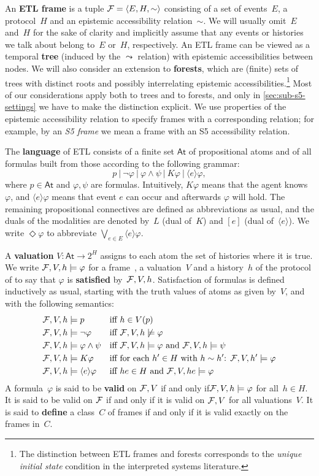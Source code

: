 \documentclass{article}
\def\dfn{\textbf}
\newcommand{\acc}{\sim}
\newcommand{\nextstep}{\Diamond}
\newcommand{\after}[1]{\langle#1\rangle}
\newcommand{\afterall}[1]{[#1]}
\renewcommand{\phi}{\varphi}
\newcommand{\tiff}{if and only if\xspace}
\newcounter{#1}
\begin{document}
An \dfn{ETL frame} is a tuple $\F=\langle E,H,\acc\rangle$ consisting of
a set of events~$E$, a protocol~$H$ and an epistemic accessibility relation~$\acc$.
We will usually omit~$E$ and~$H$ for the sake of clarity and implicitly assume that
any events or histories we talk about belong to~$E$ or~$H$, respectively.
An ETL frame can be viewed as a temporal \dfn{tree} (induced by the $\leadsto$ relation)
with epistemic accessibilities between nodes.
We will also consider an extension to \dfn{forests},
which are (finite) sets of trees with distinct roots and possibly interrelating epistemic accessibilities.\footnote{The distinction between ETL frames and forests corresponds
  to the \emph{unique initial state} condition in the interpreted systems literature.}
Most of our considerations apply both to trees and to forests,
and only in \cref{sec:sub-s5-settings} we have to make the distinction explicit.
We use properties of the epistemic accessibility relation to specify frames with a corresponding relation;
for example, by an \emph{S5 frame} we mean a frame with an S5 accessibility relation.

The \dfn{language} of ETL consists of a finite set $\mathsf{At}$ of propositional atoms
and of all formulas built from those according to the following grammar:
\[
p~|~\neg\varphi~|~\varphi\wedge\psi~|~K\varphi~|~\after e \varphi\mathpunct,
\]
where $p\in\mathsf{At}$ and $\varphi,\psi$ are formulas.
Intuitively, $K\varphi$ means that the agent knows $\varphi$,
and $\after e\varphi$ means that event $e$ can occur and afterwards $\varphi$ will hold.
The remaining propositional connectives are defined as abbreviations as usual,
and the duals of the modalities are denoted by~$L$ (dual of~$K$) and $\afterall e$ (dual of~$\after e$).
We write $\nextstep\phi$ to abbreviate $\bigvee_{e\in E}\after e\phi$.

A \dfn{valuation} $V:\mathsf{At}\to 2^H$ assigns to each atom the set of histories where it is true.
We write $\mathcal{F},V,h\models\varphi$ for a frame~\F, a valuation~$V$ and a history~$h$ of the protocol of \F
to say that $\varphi$ is \dfn{satisfied} by~$\mathcal{F},V,h$.
Satisfaction of formulas is defined inductively as usual,
starting with the truth values of atoms as given by~$V$,
and with the following semantics:
\begin{align*}
  \F,V,h&\models p &&\text{iff $h\in V(p)$}\\
  \F,V,h&\models \neg\varphi &&\text{iff $\F,V,h\not\models\varphi$}\\
  \F,V,h&\models \varphi\wedge\psi &&\text{iff $\F,V,h\models\varphi$ and $\F,V,h\models\psi$}\\
  \F,V,h&\models K\varphi &&\text{iff for each $h'\in H$ with $h\acc h'$: $\F,V,h'\models\varphi$}\\
  \F,V,h&\models \after e\varphi &&\text{iff $he\in H$ and $\F,V,he\models\varphi$}
\end{align*}
A formula~$\varphi$ is said to be \dfn{valid} on $\mathcal{F},V$ \tiff $\mathcal{F},V,h\models\varphi$ for all~$h\in H$.
It is said to be valid on $\mathcal{F}$ \tiff it is valid on $\mathcal{F},V$ for all valuations~$V$.
It is said to \dfn{define} a class~$C$ of frames
\tiff it is valid exactly on the frames in~$C$.
\end{document}
